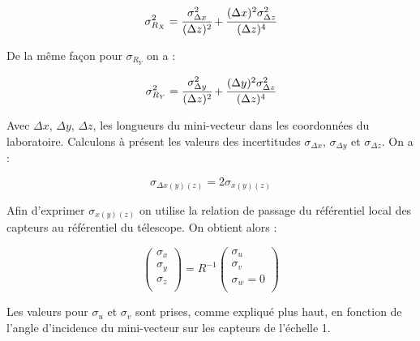    \begin{equation}
     \sigma_{R_X}^2 = \cfrac{ \sigma_{\Delta x}^2 }{ (\Delta z)^2 } + \cfrac{ (\Delta x)^2 \sigma_{\Delta z}^2 }{ (\Delta z)^4 }
   \end{equation}
   
   De la m\^eme façon pour $\sigma_{R_Y}$ on a : 
   
   \begin{equation}
     \sigma_{R_Y}^2 = \cfrac{ \sigma_{\Delta y}^2 }{ (\Delta z)^2 } + \cfrac{ (\Delta y)^2 \sigma_{\Delta z}^2 }{ (\Delta z)^4 }
   \end{equation}

   Avec $\Delta x$, $\Delta y$, $\Delta z$, les longueurs du mini-vecteur dans les coordonn\'ees du laboratoire. Calculons \`a pr\'esent les valeurs des incertitudes $\sigma_{\Delta x}$, $\sigma_{\Delta y}$ et $\sigma_{\Delta z}$. On a : 
   
   \begin{equation}
    \sigma_{\Delta x(y)(z)} = 2 \sigma_{x(y)(z)}
   \end{equation}
   
   Afin d'exprimer $\sigma_{x(y)(z)}$ on utilise la relation de passage du r\'ef\'erentiel local des capteurs au r\'ef\'erentiel du t\'elescope. On obtient alors : 
   
  \begin{equation}
   \begin{pmatrix} \sigma_x \\ \sigma_y \\ \sigma_z \\ \end{pmatrix} = R^{-1} \begin{pmatrix} \sigma_u \\ \sigma_v \\ \sigma_w = 0 \\ \end{pmatrix}
  \end{equation}
   
   Les valeurs pour $\sigma_u$ et $\sigma_v$ sont prises, comme expliqu\'e plus haut, en fonction de l'angle d'incidence du mini-vecteur sur les capteurs de l'\'echelle 1.
   
   
